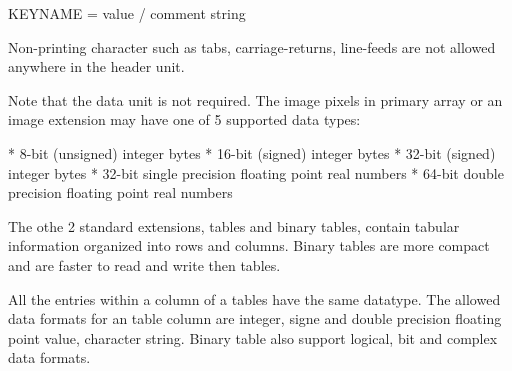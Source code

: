 \begtt
KEYNAME = value / comment string
\endtt

Non-printing  character such as tabs,
carriage-returns, line-feeds are not allowed anywhere in
the header unit.

Note that the data unit is not required. The image pixels
in primary array or an image extension may have one of
5 supported data types:

\begitems
* 8-bit (unsigned) integer bytes
* 16-bit (signed) integer bytes
* 32-bit (signed) integer bytes
* 32-bit single precision floating point real numbers
* 64-bit double precision floating point real numbers
\enditems

The othe 2 standard extensions,  tables and binary
tables, contain tabular information organized into rows
and columns. Binary tables are more compact and are faster
to read and write then  tables.

All the entries within a column of a tables have the same
datatype. The allowed data formats for an  table
column are integer, signe and double precision floating
point value, character string. Binary table also support
logical, bit and complex data formats.
